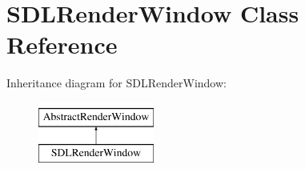 \hypertarget{classSDLRenderWindow}{\section{S\-D\-L\-Render\-Window Class Reference}
\label{classSDLRenderWindow}
}
Inheritance diagram for S\-D\-L\-Render\-Window\-:\begin{figure}[H]
\begin{center}
\leavevmode
\includegraphics[height=2.000000cm]{classSDLRenderWindow}
\end{center}
\end{figure}
